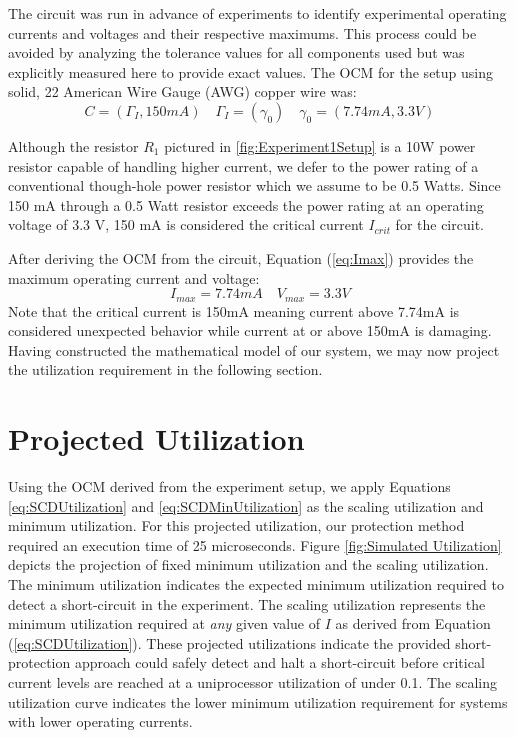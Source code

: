 \documentclass[11pt,oneside]{report}
\begin{document}
    The circuit was run in advance of experiments to identify experimental operating currents and voltages and their respective maximums. This process could be avoided by analyzing the tolerance values for all components used but was explicitly measured here to provide exact values. The OCM for the setup using solid, 22 American Wire Gauge (AWG) copper wire was:
    \begin{equation}\label{eq:OCMSetup}
    C = (\Gamma_{I}, 150mA) \quad \Gamma_{I} = (\gamma_{0}) \quad \gamma_{0} = (7.74mA, 3.3V) \nonumber
    \end{equation}
    
    Although the resistor $R_{1}$ pictured in \ref{fig:Experiment1Setup} is a 10W power resistor capable of handling higher current, we defer to the power rating of a conventional though-hole power resistor which we assume to be 0.5 Watts. Since 150 mA through a 0.5 Watt resistor exceeds the power rating at an operating voltage of 3.3 V, 150 mA is considered the critical current $I_{crit}$ for the circuit.
    
    After deriving the OCM from the circuit, Equation (\ref{eq:Imax}) provides the maximum operating current and voltage:
    \begin{equation}
    I_{max} =  7.74mA \nonumber \quad V_{max} = 3.3V \nonumber
    \end{equation}
    Note that the critical current is 150mA meaning current above 7.74mA is considered unexpected behavior while current at or above 150mA is damaging. Having constructed the mathematical model of our system, we may now project the utilization requirement in the following section. 
    
    \section{Projected Utilization}
    Using the OCM derived from the experiment setup, we apply Equations \ref{eq:SCDUtilization} and \ref{eq:SCDMinUtilization} as the scaling utilization and minimum utilization. For this projected utilization, our protection method required an execution time of 25 microseconds. Figure \ref{fig:Simulated Utilization} depicts the projection of fixed minimum utilization and the scaling utilization. The minimum utilization indicates the expected minimum utilization required to detect a short-circuit in the experiment. The scaling utilization represents the minimum utilization required at \textit{any} given value of $I$ as derived from Equation (\ref{eq:SCDUtilization}). These projected utilizations indicate the provided short-protection approach could safely detect and halt a short-circuit before critical current levels are reached at a uniprocessor utilization of under 0.1. The scaling utilization curve indicates the lower minimum utilization requirement for systems with lower operating currents.
    
\end{document}
